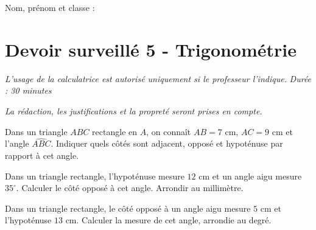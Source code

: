 \documentclass[a4paper,10pt]{report}
\begin{document}
\pagestyle{empty}
\noindent Nom, prénom et classe : \dotfill

\section*{Devoir surveillé 5 - Trigonométrie}

\noindent \textit{L'usage de la calculatrice est autorisé uniquement si le professeur l'indique.} \hfill \textit{Durée : 30 minutes}

\medskip
\noindent \textit{La rédaction, les justifications et la propreté seront prises en compte.}


\begin{ex}
Dans un triangle $ABC$ rectangle en $A$, on connaît $AB=7$ cm, $AC=9$ cm et l'angle $\widehat{ABC}$. Indiquer quels côtés sont adjacent, opposé et hypoténuse par rapport à cet angle.
\medskip\noindent\grandscarreaux{\linewidth}{3cm}
\end{ex}
\begin{ex}
Dans un triangle rectangle, l'hypoténuse mesure $12$ cm et un angle aigu mesure $35^\circ$. Calculer le côté opposé à cet angle. Arrondir au millimètre.
\medskip\noindent\grandscarreaux{\linewidth}{4cm}
\end{ex}
\begin{ex}
Dans un triangle rectangle, le côté opposé à un angle aigu mesure $5$ cm et l'hypoténuse $13$ cm. Calculer la mesure de cet angle, arrondie au degré.
\medskip\noindent\grandscarreaux{\linewidth}{4cm}
\end{ex}
\end{document}
